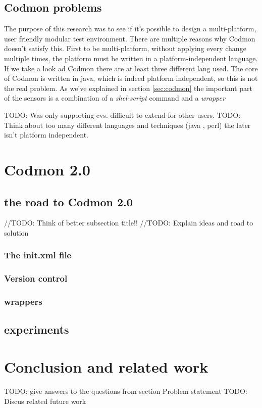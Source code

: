 \documentclass[a4paper,10pt]{scrartcl}
\newcommand{\project}{Codmon 2.0}
\begin{document}
\subsection{Codmon problems}
\label{subsec:CodmonProblems}
The purpose of this research was to see if it's possible to design a multi-platform, user friendly modular test environment. There are multiple reasons why Codmon doesn't satisfy this. First
to be multi-platform, without applying every change multiple times, the platform must be written in a platform-independent language. If we take a look ad Codmon there are at least three 
different lang used. The core of Codmon is written in java, which is indeed platform independent\cite{Java}, so this is not the real problem. As we've explained in section \ref{sec:codmon} the
important part of the sensors is a combination of a \emph{shel-script} command and a \emph{wrapper}

TODO: Was only supporting cvs. difficult to extend for other users.
TODO: Think about too many different languages and techniques (java , perl) the later isn't platform independent.


\newpage
\section{\project{}}
\label{sec:Codmon2.0}

\subsection{the road to \project{}}
//TODO: Think of better subsection title!!
//TODO: Explain ideas and road to solution

\subsubsection{The init.xml file}
\label{subsec:init}

\subsubsection{Version control}
\label{subsec:versionControl}

\subsubsection{wrappers}
\label{subsec:wrappers}

\subsection{experiments}
\label{sec:experiments}

\newpage

\section{Conclusion and related work}
\label{sec:conclusion}
TODO: give answers to the questions from section Problem statement
TODO: Discus related future work
\newpage


\end{document}
